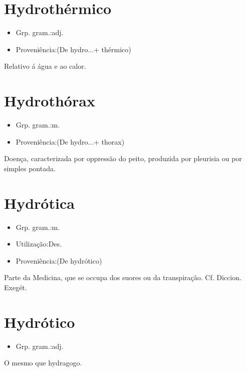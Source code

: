 \documentclass{article}
\begin{document}
\section{Hydrothérmico}
\begin{itemize}
\item {Grp. gram.:adj.}
\end{itemize}
\begin{itemize}
\item {Proveniência:(De \textunderscore hydro...\textunderscore  + \textunderscore thérmico\textunderscore )}
\end{itemize}
Relativo á água e ao calor.
\section{Hydrothórax}
\begin{itemize}
\item {Grp. gram.:m.}
\end{itemize}
\begin{itemize}
\item {Proveniência:(De \textunderscore hydro...\textunderscore  + \textunderscore thorax\textunderscore )}
\end{itemize}
Doença, caracterizada por oppressão do peito, produzida por pleurisia ou por simples pontada.
\section{Hydrótica}
\begin{itemize}
\item {Grp. gram.:m.}
\end{itemize}
\begin{itemize}
\item {Utilização:Des.}
\end{itemize}
\begin{itemize}
\item {Proveniência:(De \textunderscore hydrótico\textunderscore )}
\end{itemize}
Parte da Medicina, que se occupa dos suores ou da transpiração. Cf. \textunderscore Diccion. Exegét.\textunderscore 
\section{Hydrótico}
\begin{itemize}
\item {Grp. gram.:adj.}
\end{itemize}
O mesmo que \textunderscore hydragogo\textunderscore .
\end{document}
